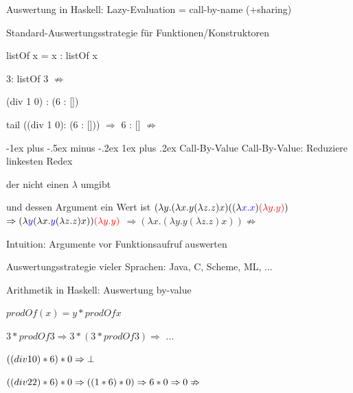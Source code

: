 \documentclass[10pt]{article}
\makeatletter
\renewcommand{\subsubsection}{\@startsection{subsubsection}{3}{0mm}%
                                {-1ex plus -.5ex minus -.2ex}%
                                {1ex plus .2ex}%
                                {\normalfont\small\bfseries}}
\makeatother
\begin{document}
  Auswertung in Haskell: \color{blue} Lazy-Evaluation = call-by-name (+sharing)\color{black}
  \begin{itemize*}
    \item Standard-Auswertungsstrategie für Funktionen/Konstruktoren
    \item listOf x = x : listOf x
    \item 3: listOf 3 $\nRightarrow$
    \item (div 1 0) : (6 : [])
    \item tail ((div 1 0): (6 : [])) $\Rightarrow$ 6 : [] $\nRightarrow$
  \end{itemize*}
  
  \subsubsection{Call-By-Value}
  Call-By-Value: Reduziere linkesten Redex
  \begin{itemize*}
    \item der nicht einen $\lambda$ umgibt
    \item und dessen Argument ein \color{blue} Wert \color{black} ist
    \subsubitem $(\lambda y.(\lambda x.y(\lambda z.z)x)((\lambda \color{blue} x.x \color{black})\color{red}(\lambda y.y)\color{black})$
    \subsubitem $\Rightarrow (\lambda \color{blue}y\color{black}(\lambda x. \color{blue}y\color{black}(\lambda z.z)x))\color{red}(\lambda y.y)\color{black}$
    \subsubitem $\Rightarrow (\lambda x.(\lambda y.y(\lambda z.z)x))  \nRightarrow$
    \item Intuition: Argumente vor Funktionsaufruf auswerten
    \item Auswertungsstrategie vieler Sprachen: Java, C, Scheme, ML, ...
    \item Arithmetik in Haskell: Auswertung by-value
    \item $prodOf(x) = y * prodOf x$
    \item $3 * prodOf 3 \Rightarrow 3 * (3 * prodOf 3) \Rightarrow$ ...
    \item $((div \space1 \space 0) * 6) * 0 \Rightarrow \bot$
    \item $((div \space2 \space 2) * 6) * 0 \Rightarrow ((1 * 6) * 0) \Rightarrow 6 * 0\Rightarrow 0 \nRightarrow$
  \end{itemize*}
  
\end{document}
